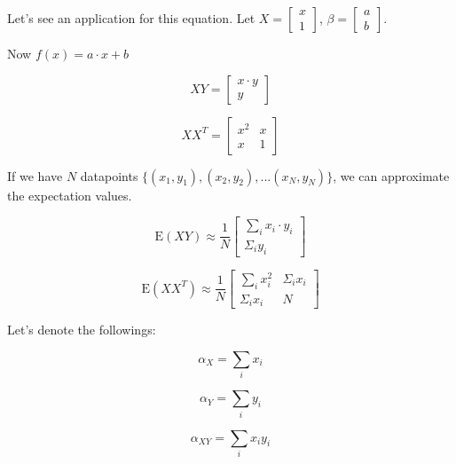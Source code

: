 \documentclass{article}
\begin{document}
Let's see an application for this equation. Let $X=\begin{bmatrix}x\\ 1\end{bmatrix}$, $\beta = \begin{bmatrix}a\\b\end{bmatrix}$.

Now $f(x) = a\cdot x + b$

\begin{equation}
    XY = \begin{bmatrix}x\cdot y \\ y\end{bmatrix}
\end{equation}

\begin{equation}
    XX^T = \begin{bmatrix} x^2 & x \\ x & 1 \end{bmatrix}
\end{equation}

If we have $N$ datapoints $\{(x_1, y_1), (x_2, y_2), ... (x_N, y_N)\}$, we can approximate the expectation values.

\begin{equation}
    \text{E}(XY) \approx \frac 1N \begin{bmatrix}\sum_i x_i\cdot y_i \\ \Sigma_i y_i\end{bmatrix}
\end{equation}

\begin{equation}
    \text{E}(XX^T) \approx \frac 1N \begin{bmatrix} \sum_i x^2_i & \Sigma_i x_i \\ \Sigma_i x_i & N \end{bmatrix}
\end{equation}

Let's denote the followings:

\begin{equation}
    \alpha_X = \sum_i x_i
\end{equation}

\begin{equation}
    \alpha_Y = \sum_i y_i
\end{equation}

\begin{equation}
    \alpha_{XY} = \sum_i x_i y_i
\end{equation}
\end{document}
